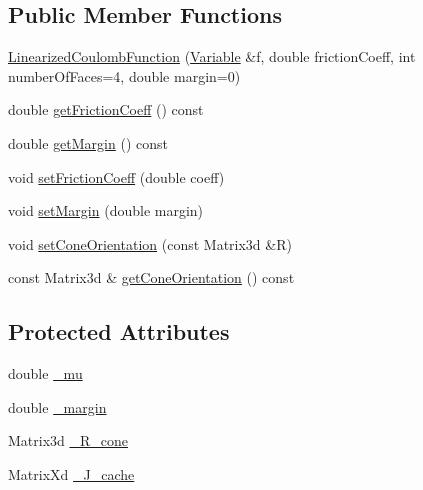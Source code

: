 \subsection*{Public Member Functions}
\begin{DoxyCompactItemize}
\item 
\hyperlink{classocra_1_1LinearizedCoulombFunction_af80b2f4c57d291f389f4e9e4435f3baa}{Linearized\+Coulomb\+Function} (\hyperlink{classocra_1_1Variable}{Variable} \&f, double friction\+Coeff, int number\+Of\+Faces=4, double margin=0)
\end{DoxyCompactItemize}
{\bf }\par
\begin{DoxyCompactItemize}
\item 
double \hyperlink{classocra_1_1LinearizedCoulombFunction_a77d1895c16400018d57f866e70e47986}{get\+Friction\+Coeff} () const 
\item 
double \hyperlink{classocra_1_1LinearizedCoulombFunction_a71a74aef1fac31b249cde2a8bdb15b0e}{get\+Margin} () const 
\item 
void \hyperlink{classocra_1_1LinearizedCoulombFunction_ab01ef6ae4c98929ebc4ef1035fe3df47}{set\+Friction\+Coeff} (double coeff)
\item 
void \hyperlink{classocra_1_1LinearizedCoulombFunction_ae220b1da32667c6ba6125af02a170113}{set\+Margin} (double margin)
\item 
void \hyperlink{classocra_1_1LinearizedCoulombFunction_a682565ed83043ec13a966bd0db51f123}{set\+Cone\+Orientation} (const Matrix3d \&R)
\item 
const Matrix3d \& \hyperlink{classocra_1_1LinearizedCoulombFunction_a9c685a13ef1406e713fd27e2f386b6ff}{get\+Cone\+Orientation} () const 
\end{DoxyCompactItemize}

\subsection*{Protected Attributes}
\begin{DoxyCompactItemize}
\item 
double \hyperlink{classocra_1_1LinearizedCoulombFunction_a18cfee3d5d056443d2fe1980b4899fa4}{\+\_\+mu}
\item 
double \hyperlink{classocra_1_1LinearizedCoulombFunction_abf137cc7ce5ea91ffa25a95feebddbd1}{\+\_\+margin}
\item 
Matrix3d \hyperlink{classocra_1_1LinearizedCoulombFunction_abf999f311e6563224a5ac852f44e7af4}{\+\_\+\+R\+\_\+cone}
\item 
Matrix\+Xd \hyperlink{classocra_1_1LinearizedCoulombFunction_aa94e64532f28678c15ff1696f7c25684}{\+\_\+\+J\+\_\+cache}
\end{DoxyCompactItemize}
